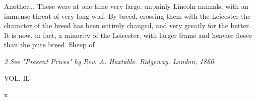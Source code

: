 Another... These were at one time very large, unpainly Lincoln animals, with an immense threat of very long wolf. By breed, crossing them with the Leicester the character of the breed has been entirely changed, and very greatly for the better. It is now, in fact, a minority of the Leicester, with larger frame and heavier fleece than the pure breed. Sheep of\par\medskip
{\small\itshape 3 See "Present Prices" by Rev. A. Haxtable. Ridgeway. London, 1860.\par}\medskip
VOL. IL\par{} x\par\medskip
